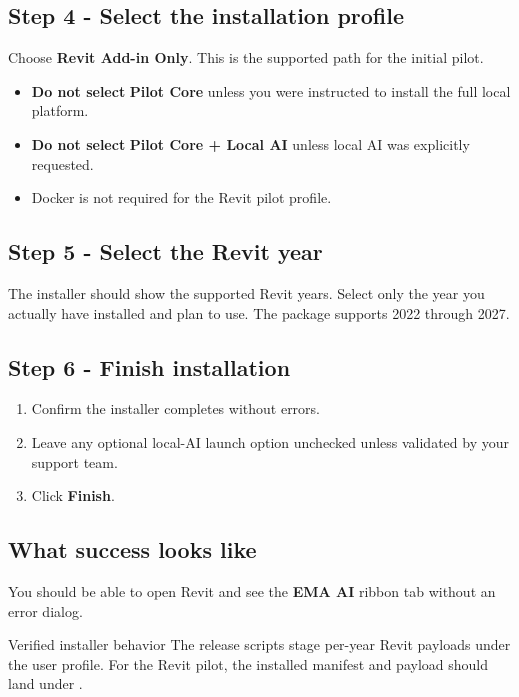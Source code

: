 \subsection*{Step 4 - Select the installation profile}
Choose \textbf{Revit Add-in Only}. This is the supported path for the initial pilot.

\begin{itemize}
  \item \textbf{Do not select} \textbf{Pilot Core} unless you were instructed to install the full local platform.
  \item \textbf{Do not select} \textbf{Pilot Core + Local AI} unless local AI was explicitly requested.
  \item Docker is not required for the Revit pilot profile.
\end{itemize}

\subsection*{Step 5 - Select the Revit year}
The installer should show the supported Revit years. Select only the year you actually have installed and plan to use. The package supports 2022 through 2027.

\subsection*{Step 6 - Finish installation}
\begin{enumerate}
  \item Confirm the installer completes without errors.
  \item Leave any optional local-AI launch option unchecked unless validated by your support team.
  \item Click \textbf{Finish}.
\end{enumerate}

\subsection*{What success looks like}
You should be able to open Revit and see the \textbf{EMA AI} ribbon tab without an error dialog.

\begin{tipbox}{Verified installer behavior}
The release scripts stage per-year Revit payloads under the user profile. For the Revit pilot, the installed manifest and payload should land under .
\end{tipbox}

